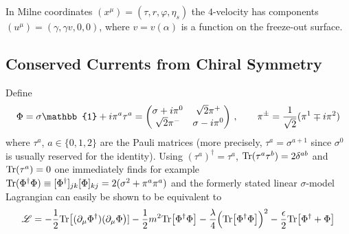 In Milne coordinates $(x^\mu)=(\tau,r,\varphi,\eta_s)$ the $4$-velocity has components $(u^\mu)=(\gamma,\gamma v,0,0)$, where $v=v(\alpha)$ is a function on the freeze-out surface. 

\subsection{Conserved Currents from Chiral Symmetry}

Define
\begin{equation}
    \Phi=\sigma\mathbb{1}+\imagu\pi^a\tau^a=\begin{pmatrix}
        \sigma+\imagu\pi^0 & \sqrt{2}\pi^+      \\
        \sqrt{2}\pi^-      & \sigma-\imagu\pi^0
    \end{pmatrix}\,,\qquad\pi^\pm=\frac{1}{\sqrt{2}}(\pi^1\mp\imagu\pi^2)
\end{equation}
where $\tau^a$, $a\in\{0,1,2\}$ are the Pauli matrices (more precisely, $\tau^a=\sigma^{a+1}$ since $\sigma^0$ is usually reserved for the identity). Using $(\tau^a)^\dagger=\tau^a$, ${\text{Tr}}(\tau^a\tau^b)=2\delta^{ab}$ and ${\text{Tr}}(\tau^a)=0$ one immediately finds for example ${\text{Tr}}(\Phi^\dagger\Phi)\equiv[\Phi^\dagger]_{jk}[\Phi]_{kj}=2(\sigma^2+\pi^a\pi^a)$ and the formerly stated linear $\sigma$-model Lagrangian can easily be shown to be equivalent to
\begin{equation}
    \mathscr{L}=-\frac{1}{2}{\text{Tr}}\big[(\partial_\mu\Phi^\dagger)(\partial_\mu\Phi\big)]-\frac{1}{2}m^2{\text{Tr}}\big[\Phi^\dagger\Phi\big]-\frac{\lambda}{4}\Big({\text{Tr}}\big[\Phi^\dagger\Phi\big]\Big)^2-\frac{\epsilon}{2}{\text{Tr}}\big[\Phi^\dagger+\Phi\big]
    \label{eq:Lagrangian_LinearSigma2}
\end{equation}

